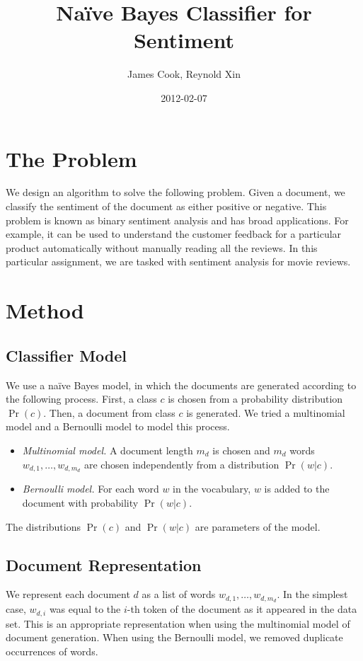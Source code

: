 \documentclass{article}
\title{Na\"{i}ve Bayes Classifier for Sentiment}
\author{James Cook, Reynold Xin}
\date{2012-02-07}
\begin{document}
	
\maketitle

\section{The Problem}
We design an algorithm to solve the following problem. Given a document, we classify the sentiment of the document as either positive or negative. This problem is known as binary sentiment analysis and has broad applications. For example, it can be used to understand the customer feedback for a particular product automatically without manually reading all the reviews. In this particular assignment, we are tasked with sentiment analysis for movie reviews.


\section{Method}

\subsection{Classifier Model}

We use a na\"ive Bayes model, in which the documents are generated according to the following process.
First, a class \(c\) is chosen from a probability distribution \(\Pr(c)\).
Then, a document from class \(c\) is generated.
We tried a multinomial model and a Bernoulli model to model this process.
\begin{itemize}
\item \emph{Multinomial model.}  A document length \(m_d\) is chosen and \(m_d\) words \(w_{d,1}, \dotsc, w_{d,m_d}\) are chosen independently from a distribution \(\Pr(w|c)\).
\item \emph{Bernoulli model.}  For each word \(w\) in the vocabulary, \(w\) is added to the document with probability \(\Pr(w|c)\).
\end{itemize}
The distributions \(\Pr(c)\) and \(\Pr(w|c)\) are parameters of the model.

\subsection{Document Representation}

We represent each document \(d\) as a list of words \(w_{d,1}, \dotsc, w_{d,m_d}\).
In the simplest case, \(w_{d,i}\) was equal to the \(i\)-th token of the document as it appeared in the data set.
This is an appropriate representation when using the multinomial model of document generation.
When using the Bernoulli model, we removed duplicate occurrences of words.
\end{document}
